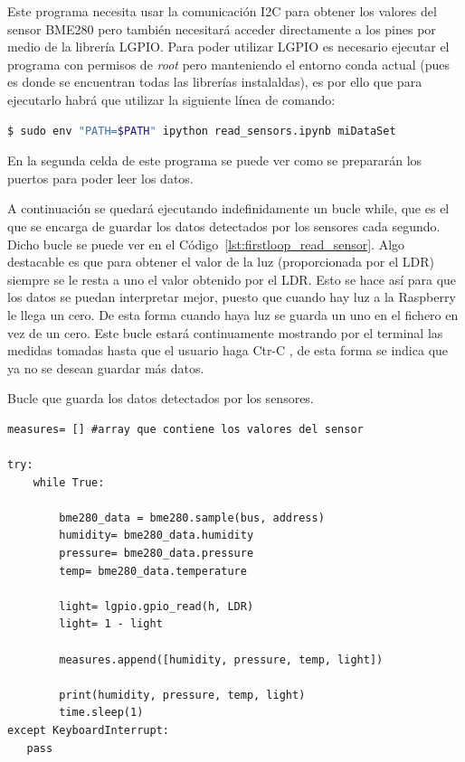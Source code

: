 \documentclass[a4paper, 12pt]{book}
\begin{document}
Este programa necesita usar la comunicación I2C para obtener los valores del sensor BME280 pero también necesitará acceder directamente a los pines por medio de la librería LGPIO. Para poder utilizar LGPIO es necesario ejecutar el programa con permisos de \textit{root} pero manteniendo el entorno conda actual (pues es donde se encuentran todas las librerías instalaldas), es por ello que para ejecutarlo habrá que utilizar la siguiente línea de comando:  


\begin{lstlisting}[language=bash]
    $ sudo env "PATH=$PATH" ipython read_sensors.ipynb miDataSet
\end{lstlisting}

En la segunda celda de este programa se puede ver como se prepararán los puertos para poder leer los datos. 

A continuación se quedará ejecutando indefinidamente un bucle while, que es el que se encarga de guardar los datos detectados por los sensores cada segundo. Dicho bucle se puede ver en el Código~\ref{lst:firstloop_read_sensor}. Algo destacable es que para obtener el valor de la luz (proporcionada por el LDR) siempre se le resta a uno el valor obtenido por el LDR. Esto se hace así para que los datos se puedan interpretar mejor, puesto que cuando hay luz a la Raspberry le llega un cero. De esta forma cuando haya luz se guarda un uno en el fichero en vez de un cero. 
Este bucle estará continuamente mostrando por el terminal las medidas tomadas hasta que el usuario haga Ctr-C , de esta forma se indica que ya no se desean guardar más datos.

\begin{listing}[]
    \caption{Bucle que guarda los datos detectados por los sensores.}{}
    \label{lst:firstloop_read_sensor}
    \begin{verbatim}
measures= [] #array que contiene los valores del sensor

try:
    while True:

        bme280_data = bme280.sample(bus, address)
        humidity= bme280_data.humidity
        pressure= bme280_data.pressure
        temp= bme280_data.temperature
        
        light= lgpio.gpio_read(h, LDR)
        light= 1 - light
        
        measures.append([humidity, pressure, temp, light])
        
        print(humidity, pressure, temp, light)
        time.sleep(1)
except KeyboardInterrupt:
   pass  
    \end{verbatim}
\end{listing}
\end{document}

